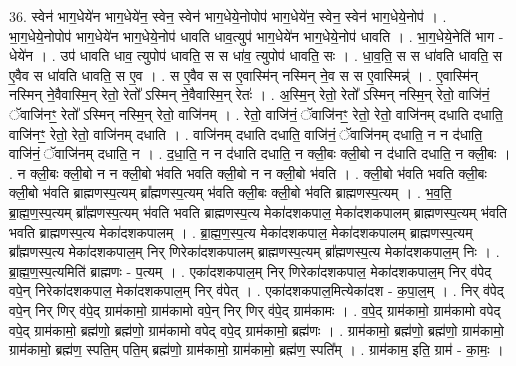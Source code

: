 \documentclass[17pt]{extarticle}
\begin{document}
36. स्वेन॑ भाग॒धेये॑न भाग॒धेये॑न॒ स्वेन॒ स्वेन॑ भाग॒धेये॒नोपोप॑ भाग॒धेये॑न॒ स्वेन॒ स्वेन॑ भाग॒धेये॒नोप॑ । . भा॒ग॒धेये॒नोपोप॑ भाग॒धेये॑न भाग॒धेये॒नोप॑ धावति धाव॒त्युप॑ भाग॒धेये॑न भाग॒धेये॒नोप॑ धावति । . भा॒ग॒धेये॒नेति॑ भाग - धेये॑न । . उप॑ धावति धाव॒ त्युपोप॑ धावति॒ स स धा॑व॒ त्युपोप॑ धावति॒ सः । . धा॒व॒ति॒ स स धा॑वति धावति॒ स ए॒वैव स धा॑वति धावति॒ स ए॒व । . स ए॒वैव स स ए॒वास्मि॑न् नस्मिन् ने॒व स स ए॒वास्मिन्न्॑ । . ए॒वास्मि॑न् नस्मिन् ने॒वैवास्मि॒न् रेतो॒ रेतो᳚ ऽस्मिन् ने॒वैवास्मि॒न् रेतः॑ । . अ॒स्मि॒न् रेतो॒ रेतो᳚ ऽस्मिन् नस्मि॒न् रेतो॒ वाजि॑नं॒ ॅवाजि॑नꣳ॒॒ रेतो᳚ ऽस्मिन् नस्मि॒न् रेतो॒ वाजि॑नम् । . रेतो॒ वाजि॑नं॒ ॅवाजि॑नꣳ॒॒ रेतो॒ रेतो॒ वाजि॑नम् दधाति दधाति॒ वाजि॑नꣳ॒॒ रेतो॒ रेतो॒ वाजि॑नम् दधाति । . वाजि॑नम् दधाति दधाति॒ वाजि॑नं॒ ॅवाजि॑नम् दधाति॒ न न द॑धाति॒ वाजि॑नं॒ ॅवाजि॑नम् दधाति॒ न । . द॒धा॒ति॒ न न द॑धाति दधाति॒ न क्ली॒बः क्ली॒बो न द॑धाति दधाति॒ न क्ली॒बः । . न क्ली॒बः क्ली॒बो न न क्ली॒बो भ॑वति भवति क्ली॒बो न न क्ली॒बो भ॑वति । . क्ली॒बो भ॑वति भवति क्ली॒बः क्ली॒बो भ॑वति ब्राह्मणस्प॒त्यम् ब्रा᳚ह्मणस्प॒त्यम् भ॑वति क्ली॒बः क्ली॒बो भ॑वति ब्राह्मणस्प॒त्यम् । . भ॒व॒ति॒ ब्रा॒ह्म॒ण॒स्प॒त्यम् ब्रा᳚ह्मणस्प॒त्यम् भ॑वति भवति ब्राह्मणस्प॒त्य मेका॑दशकपाल॒ मेका॑दशकपालम् ब्राह्मणस्प॒त्यम् भ॑वति भवति ब्राह्मणस्प॒त्य मेका॑दशकपालम् । . ब्रा॒ह्म॒ण॒स्प॒त्य मेका॑दशकपाल॒ मेका॑दशकपालम् ब्राह्मणस्प॒त्यम् ब्रा᳚ह्मणस्प॒त्य मेका॑दशकपाल॒म् निर् णिरेका॑दशकपालम् ब्राह्मणस्प॒त्यम् ब्रा᳚ह्मणस्प॒त्य मेका॑दशकपाल॒म् निः । . ब्रा॒ह्म॒ण॒स्प॒त्यमिति॑ ब्राह्मणः - प॒त्यम् । . एका॑दशकपाल॒म् निर् णिरेका॑दशकपाल॒ मेका॑दशकपाल॒म् निर् व॑पेद् वपे॒न् निरेका॑दशकपाल॒ मेका॑दशकपाल॒म् निर् व॑पेत् । . एका॑दशकपाल॒मित्येका॑दश - क॒पा॒ल॒म् । . निर् व॑पेद् वपे॒न् निर् णिर् व॑पे॒द् ग्राम॑कामो॒ ग्राम॑कामो वपे॒न् निर् णिर् व॑पे॒द् ग्राम॑कामः । . व॒पे॒द् ग्राम॑कामो॒ ग्राम॑कामो वपेद् वपे॒द् ग्राम॑कामो॒ ब्रह्म॑णो॒ ब्रह्म॑णो॒ ग्राम॑कामो वपेद् वपे॒द् ग्राम॑कामो॒ ब्रह्म॑णः । . ग्राम॑कामो॒ ब्रह्म॑णो॒ ब्रह्म॑णो॒ ग्राम॑कामो॒ ग्राम॑कामो॒ ब्रह्म॑ण॒ स्पति॒म् पति॒म् ब्रह्म॑णो॒ ग्राम॑कामो॒ ग्राम॑कामो॒ ब्रह्म॑ण॒ स्पति᳚म् । . ग्राम॑काम॒ इति॒ ग्राम॑ - का॒मः॒ । \newline
\pagebreak
{}
\end{document}
